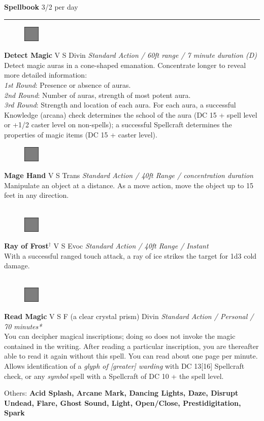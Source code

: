 \documentclass[letterpaper]{article}
\newcommand{\e}[1]{\emph{#1}}
\newcommand{\B}[1]{\textbf{#1}}
\newcommand{\D}[0]{$^\dag$}
\newcommand{\spell}[7]{
\begin{figure}
\vspace{-13pt}
\ifstrequal{#2}{Full}{  \includegraphics[width=2em]{Checkbox-Full}}{
\ifstrequal{#2}{Scroll}{\includegraphics[width=2em]{Checkbox-S}}{
                        \includegraphics[width=2em]{Checkbox}}}
\ifstrequal{#7}{}{\vspace{-1em}}{\vspace{#7}}
\end{figure}
 \B{#1} #3 {
    \ifstrequal{#4}{Conj}{\color{Plum}Conj}{%
    \ifstrequal{#4}{Divin}{\color{YellowOrange}Divin}{%
    \ifstrequal{#4}{Ench}{\color{VioletRed}Ench}{%
    \ifstrequal{#4}{Trans}{\color{LimeGreen}Trans}{%
    \ifstrequal{#4}{Evoc}{\color{RedOrange}Evoc}{%
    \ifstrequal{#4}{Illu}{\color{ProcessBlue}Illu}{%
    \ifstrequal{#4}{Abjur}{\color{CadetBlue}Abjur}{%
    \ifstrequal{#4}{Necro}{\color{Red}Necro}{%
}}}}}}}}}
{\footnotesize \e{#5}} \\
#6
}
\begin{document}
{\huge \B{Spellbook}} \hspace{2em}3/2 per day\par
\hrule\vspace{0.5em}

\spell{Detect Magic}{Full}{V S}{Divin}{Standard Action / 60ft range / 7 minute duration (D)}{
Detect magic auras in a cone-shaped emanation.  Concentrate longer to reveal more detailed information:\\
\e{1st Round}: Presence or absence of auras.\\
\e{2nd Round}: Number of auras, strength of most potent aura.\\
\e{3rd Round}: Strength and location of each aura.  For each aura, a successful Knowledge (arcana) check determines the school of the aura (DC 15 + spell level or +1/2 caster level on non-spells); a successful Spellcraft determines the properties of magic items (DC 15 + caster level).}{3em} %

\spell{Mage Hand}{Full}{V S}{Trans}{Standard Action / 40ft Range / concentration duration}{%
Manipulate an object at a distance. As a move action, move the object up to 15 feet in any direction.\\}{}\\[-2em] %

\spell{Ray of Frost\D}{Full}{V S}{Evoc}{Standard Action / 40ft Range / Instant}{
With a successful ranged touch attack, a ray of ice strikes the target for 1d3 cold damage.\\}{}\\[-2em] %

\spell{Read Magic}{Full}{V S F (a clear crystal prism)}{Divin}{Standard Action / Personal / 70 minutes*}{
You can decipher magical inscriptions; doing so does not invoke the magic contained in the writing.  After reading a particular inscription, you are thereafter able to read it again without this spell.  You can read about one page per minute. Allows identification of a \e{glyph of [greater] warding} with DC 13[16] Spellcraft check, or any \e{symbol} spell with a Spellcraft of DC 10 + the spell level.}{1em}\\[-1em] %
\begin{adjustwidth}{3em}{0em}
Others: \B{Acid Splash, Arcane Mark, Dancing Lights, Daze, Disrupt Undead, Flare, Ghost Sound, Light, Open/Close, Prestidigitation, Spark}\\
\end{adjustwidth}
\end{document}
